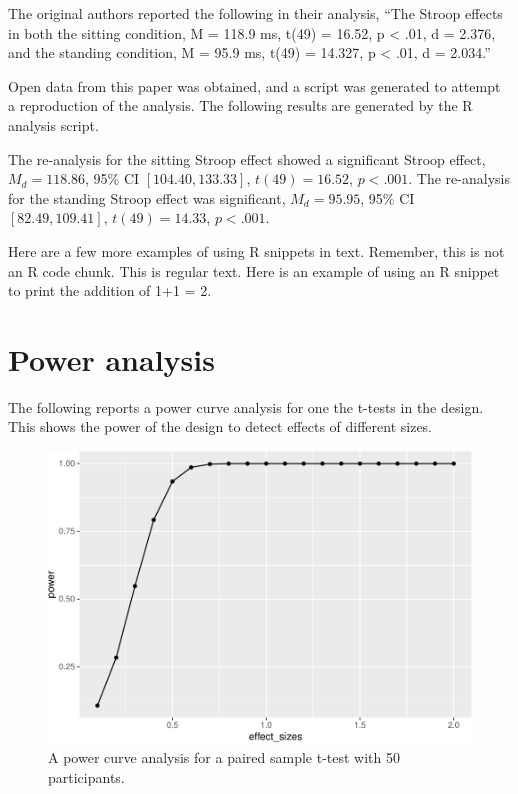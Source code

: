 \documentclass[
  man]{apa6}
\begin{document}
The original authors reported the following in their analysis, ``The Stroop effects in both the sitting condition, M = 118.9 ms, t(49) = 16.52, p \textless{} .01, d = 2.376, and the standing condition, M = 95.9 ms, t(49) = 14.327, p \textless{} .01, d = 2.034.''

Open data from this paper was obtained, and a script was generated to attempt a reproduction of the analysis. The following results are generated by the R analysis script.

The re-analysis for the sitting Stroop effect showed a significant Stroop effect, \(M_d = 118.86\), 95\% CI \([104.40, 133.33]\), \(t(49) = 16.52\), \(p < .001\). The re-analysis for the standing Stroop effect was significant, \(M_d = 95.95\), 95\% CI \([82.49, 109.41]\), \(t(49) = 14.33\), \(p < .001\).

Here are a few more examples of using R snippets in text. Remember, this is not an R code chunk. This is regular text. Here is an example of using an R snippet to print the addition of 1+1 = 2.

\hypertarget{power-analysis}{%
\section{Power analysis}\label{power-analysis}}

The following reports a power curve analysis for one the t-tests in the design. This shows the power of the design to detect effects of different sizes.

\begin{figure}
\centering
\includegraphics{SemesterProject_files/figure-latex/unnamed-chunk-4-1.pdf}
\caption{\label{fig:unnamed-chunk-4}A power curve analysis for a paired sample t-test with 50 participants.}
\end{figure}
\end{document}
